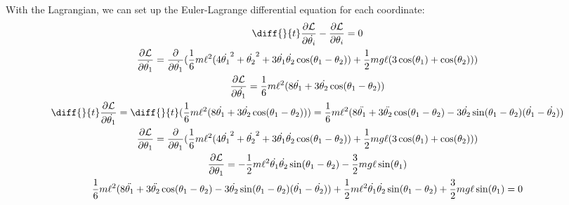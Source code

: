\documentclass[]{article}
\begin{document}
With the Lagrangian, we can set up the Euler-Lagrange differential equation for each coordinate:
\begin{gather*}
	\diff{}{t}\frac{\partial \lagr}{\partial \dot{\theta_i}} - \frac{\partial \lagr}{\partial \theta_i} = 0 \\
	\frac{\partial \lagr}{\partial \dot{\theta_1}} = \frac{\partial}{\partial \dot{\theta_1}}(\frac16m\ell^2(4\dot{\theta_1}^2 + \dot{\theta_2}^2 + 3\dot{\theta_1}\dot{\theta_2}\cos(\theta_1 - \theta_2)) + \frac12 mg\ell(3\cos(\theta_1) + \cos(\theta_2))) \\
	\frac{\partial \lagr}{\partial \dot{\theta_1}} = \frac16m\ell^2(8\dot{\theta_1} + 3\dot{\theta_2}\cos(\theta_1 - \theta_2)) \\
	\diff{}{t}\frac{\partial \lagr}{\partial \dot{\theta_1}} = \diff{}{t}(\frac16m\ell^2(8\dot{\theta_1} + 3\dot{\theta_2}\cos(\theta_1 - \theta_2))) = \frac16m\ell^2(8\ddot{\theta_1} + 3\ddot{\theta_2}\cos(\theta_1 - \theta_2) - 3\dot{\theta_2}\sin(\theta_1 - \theta_2)(\dot{\theta_1} - \dot{\theta_2})) \\
	\frac{\partial \lagr}{\partial \theta_1} = \frac{\partial}{\partial \theta_1} (\frac16m\ell^2(4\dot{\theta_1}^2 + \dot{\theta_2}^2 + 3\dot{\theta_1}\dot{\theta_2}\cos(\theta_1 - \theta_2)) + \frac12 mg\ell(3\cos(\theta_1) + \cos(\theta_2))) \\
	\frac{\partial \lagr}{\partial \theta_1} = -\frac12m\ell^2\dot{\theta_1}\dot{\theta_2}\sin(\theta_1 - \theta_2) - \frac32m g \ell \sin(\theta_1) \\
	\frac16m\ell^2(8\ddot{\theta_1} + 3\ddot{\theta_2}\cos(\theta_1 - \theta_2) - 3\dot{\theta_2}\sin(\theta_1 - \theta_2)(\dot{\theta_1} - \dot{\theta_2})) + \frac12m\ell^2\dot{\theta_1}\dot{\theta_2}\sin(\theta_1 - \theta_2) + \frac32m g \ell \sin(\theta_1) =  0
\end{gather*}
\end{document}
